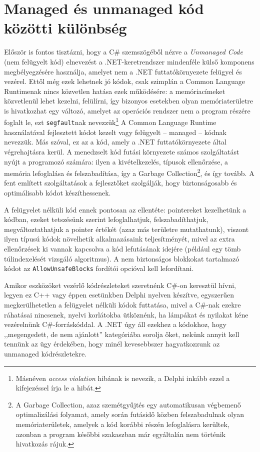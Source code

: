 \documentclass[tocnopagenum]{thesis-ekf}
\begin{document}
	\section{Managed és unmanaged kód közötti különbség}
	\label{managed_unmanaged}
	Először is fontos tisztázni, hogy a C\# szemszögéből nézve a \textit{Unmanaged Code} (nem felügyelt kód) elnevezést a .NET-keretrendszer mindenféle külső komponens megbélyegzésére használja, amelyet nem a .NET futtatókörnyezete felügyel és vezérel. Ettől még ezek lehetnek jó kódok, csak szimplán a Common Language Runtimenak nincs közvetlen hatása ezek működésére: a memóriacímeket közvetlenül lehet kezelni, felülírni, így bizonyos esetekben olyan memóriaterületre is hivatkozhat egy változó, amelyet az operációs rendszer nem a program részére foglalt le, ezt \verb*|segfault|nak nevezzük\footnote{Másnéven \textit{access violation} hibának is nevezik, a Delphi inkább ezzel a kifejezéssel írja le a hibát.}
	\cite{managed} 
	A Common Language Runtime használatával fejlesztett kódot kezelt vagy felügyelt -- managed -- kódnak nevezzük. Más szóval, ez az a kód, amely a .NET futtatókörnyezete által végrehajtásra kerül. 
	A menedzselt kód futási környezete számos szolgáltatást nyújt a programozó számára: ilyen a kivételkezelés, típusok ellenőrzése, a memória lefoglalása és felszabadítása, így a Garbage Collection\footnote{A Garbage Collection, azaz szemétgyűjtés egy automatikusan végbemenő optimalizálási folyamat, amely során futásidő közben felszabadulnak olyan memóriaterületek, amelyek a kód korábbi részén lefoglalásra kerültek, azonban a program későbbi szakaszban már egyáltalán nem történik hivatkozás rájuk.}, és így tovább. A fent említett szolgáltatások a fejlesztőket szolgálják, hogy biztonságosabb és optimálisabb kódot készíthessenek.
	\cite{marshalling_serialization}
	
	A felügyelet nélküli kód ennek pontosan az ellentéte: pointereket kezelhetünk a kódban, ezeket tetszésünk szerint lefoglalhatjuk, felszabadíthatjuk, megváltoztathatjuk a pointer értékét (azaz más területre mutathatunk), viszont ilyen típusú kódok növelhetik alkalmazásaink teljesítményét, mivel az extra ellenőrzések ki vannak kapcsolva a kód lefutásának idejére (például egy tömb túlindexelését vizsgáló algoritmus).
	A nem biztonságos blokkokat tartalmazó kódot az \verb*|AllowUnsafeBlocks| fordítói opcióval kell lefordítani.
	
	Amikor eszközöket vezérlő kódrészleteket szeretnénk C\#-on keresztül hívni, legyen ez C++ vagy éppen esetünkben Delphi nyelven készítve, egyszerűen megkerülhetetlen a felügyelet nélküli kódok futtatása, mivel a C\#-nak ezekre ráhatásai nincsenek, nyelvi korlátokba ütköznénk, ha lámpákat és nyilakat kéne vezérelnünk C\#-forráskóddal. A .NET úgy áll ezekhez a kódokhoz, hogy ,,megengedett, de nem ajánlott'' kategóriába sorolja őket, nekünk annyit kell tennünk az ügy érdekében, hogy minél kevesebbszer hagyatkozzunk az unmanaged kódrészletekre.
	\cite{sof_managed}
\end{document}
